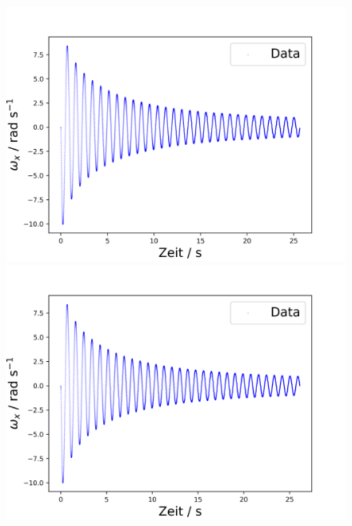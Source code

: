 \documentclass[11pt,ngerman]{scrartcl}
\begin{document}
\begin{figure}[H]
    \centering
    \begin{minipage}[htbp]{\linewidth}
        \begin{minipage}[htbp]{.32\linewidth} %
            \includegraphics[width=\linewidth]{pics/omega/fit_of_t_wx_mess_nr_4.png}
        \end{minipage}
        \begin{minipage}[htbp]{.32\linewidth} %
            \includegraphics[width=\linewidth]{pics/omega/fit_of_t_wx_mess_nr_5.png}
        \end{minipage}
        \begin{minipage}[htbp]{.32\linewidth} %

\end{minipage}
\end{minipage}
\end{figure}
\end{document}
